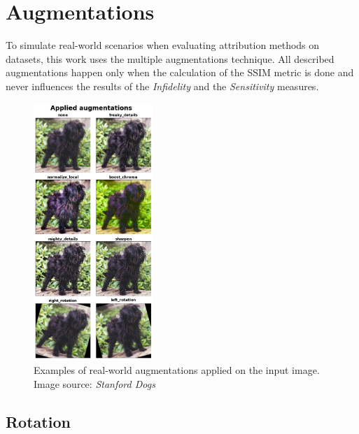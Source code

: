 \section{Augmentations}\label{section:augmentation}

To simulate real-world scenarios when evaluating attribution methods on datasets, this work uses the multiple augmentations technique. All described augmentations happen only when the calculation of the SSIM metric is done and never influences the results of the \textit{Infidelity} and the \textit{Sensitivity} measures. 

\begin{figure}
  \setlength{\belowcaptionskip}{-62pt}
  \centering
  \includegraphics[width=0.40\textwidth]{experiments/aug/augmentations_example.png}
  \caption{Examples  of  real-world augmentations applied on the input image. Image source: \textit{Stanford Dogs} \cite{stanford-dogs}}\label{fig:augmentation-example}
\end{figure}\leavevmode

\subsection*{Rotation}\label{section:rotations}

